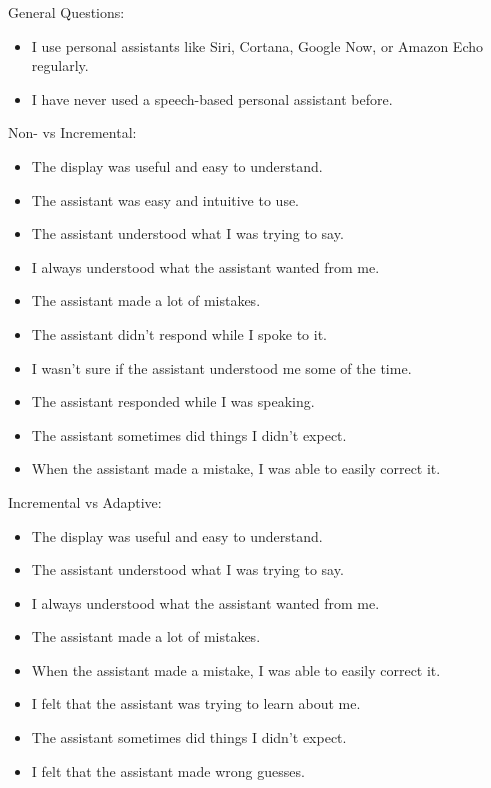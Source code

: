 \documentclass[a4paper,10pt]{article}
\begin{document}
General Questions:

\begin{itemize}
 \item I use personal assistants like Siri, Cortana, Google Now, or Amazon Echo regularly.
 \item I have never used a speech-based personal assistant before. 

\end{itemize}

Non- vs Incremental:

\begin{itemize}
 \item The display was useful and easy to understand.
 \item The assistant was easy and intuitive to use.
 \item The assistant understood what I was trying to say.
 \item I always understood what the assistant wanted from me.
 \item The assistant made a lot of mistakes.
 \item The assistant didn't respond while I spoke to it.
 \item I wasn't sure if the assistant understood me some of the time.
 \item The assistant responded while I was speaking. 
 \item The assistant sometimes did things I didn't expect. 
 \item When the assistant made a mistake, I was able to easily correct it.
\end{itemize}

Incremental vs Adaptive:
\begin{itemize}
 \item The display was useful and easy to understand.
 \item The assistant understood what I was trying to say.
 \item I always understood what the assistant wanted from me.
 \item The assistant made a lot of mistakes.
 \item When the assistant made a mistake, I was able to easily correct it.
 \item I felt that the assistant was trying to learn about me.
 \item The assistant sometimes did things I didn't expect. 
 \item I felt that the assistant made wrong guesses. 
\end{itemize}
\end{document}

